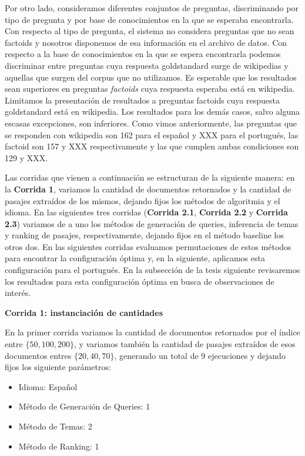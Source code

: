 Por otro lado, consideramos diferentes conjuntos de preguntas, discriminando por tipo de pregunta y por base de conocimientos en la que se esperaba encontrarla. Con respecto al tipo de pregunta, el sistema no considera preguntas que no sean factoids y nosotros disponemos de esa información en el archivo de datos. Con respecto a la base de conocimientos en la que se espera encontrarla podemos discriminar entre preguntas cuya respuesta goldstandard surge de wikipedias y aquellas que surgen del corpus que no utilizamos. Es esperable que los resultados sean superiores en preguntas \textit{factoids} cuya respuesta esperaba está en wikipedia.
Limitamos la presentación de resultados a preguntas factoids cuya respuesta goldstandard está en wikipedia. Los resultados para los demás casos, salvo alguna escasas excepciones, son inferiores. Como vimos anteriormente, las preguntas que se responden con wikipedia son 162 para el español y XXX para el portugués, las factoid son 157 y XXX respectivamente y las que cumplen ambas condiciones son 129 y XXX.  \newline


Las corridas que vienen a continuación se estructuran de la siguiente manera: en la \textbf{Corrida 1}, variamos la cantidad de documentos retornados y la cantidad de pasajes extraídos de los mismos, dejando fijos los métodos de algoritmia y el idioma. En las siguientes tres corridas (\textbf{Corrida 2.1},  \textbf{Corrida 2.2} y \textbf{Corrida 2.3}) variamos de a uno los métodos de generación de queries, inferencia de temas y ranking de pasajes, respectivamente, dejando fijos en el método baseline los otros dos. En las siguientes corridas evaluamos permutaciones de estos métodos para encontrar la configuración óptima y, en la siguiente, aplicamos esta configuración para el portugués. En la subsección de la tesis siguiente revisaremos los resultados para esta configuración óptima en busca de observaciones de interés. \newline


\textbf{Corrida 1: instanciación de cantidades} \newline

En la primer corrida variamos la cantidad de documentos retornados por el índice entre $\{50, 100, 200\}$, y variamos también la cantidad de pasajes extraídos de esos documentos entres $\{20, 40, 70\}$, generando un total de 9 ejecuciones y dejando fijos los siguiente parámetros: \newline

\begin{itemize}
  \item Idioma: Español
  \item Método de Generación de Queries: 1
  \item Método de Temas: 2
  \item Método de Ranking: 1
\end{itemize}

